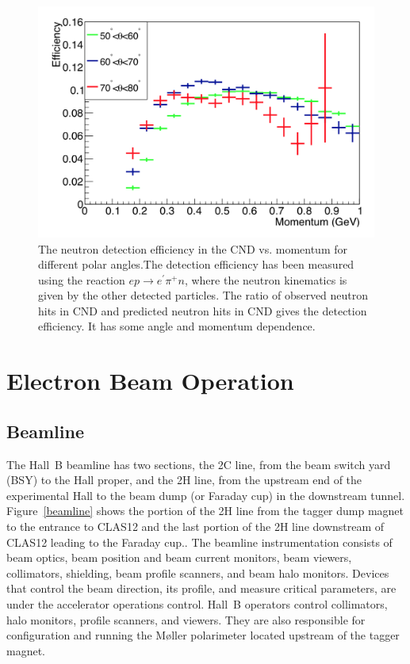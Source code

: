 \documentclass[final,3p,twocolumn]{elsarticle}
\begin{document}
\begin{figure}[htbp!]
\centerline{\includegraphics[width=0.9\columnwidth]{cnd-neutron-efficiency.png}}
\caption{The neutron detection efficiency in the CND vs. momentum for different polar angles.The  detection efficiency 
has been measured using the reaction $e p \to e^\prime \pi^+ n$, where the neutron kinematics is given by the other 
detected particles. The ratio of observed neutron hits in CND and predicted neutron hits in CND gives the detection efficiency. It 
has some angle and momentum dependence.  } 
\label{CND-neutron-efficiency}
\end{figure} 


\section{Electron Beam Operation} 

\subsection{Beamline}

The Hall~B beamline has two sections, the 2C line, from the beam switch yard (BSY) to the Hall proper, and the 2H
line, from the upstream end of the experimental Hall to the beam dump (or Faraday cup) in the downstream tunnel.
Figure~\ref{beamline} shows the portion of the 2H line from the tagger dump magnet to the entrance to CLAS12 and
the last portion of the 2H line downstream of CLAS12 leading to the Faraday cup.. The beamline instrumentation
consists of beam optics, beam position and beam current monitors, beam viewers, collimators,  shielding, beam
profile scanners, and beam halo monitors. Devices that control the beam direction, its profile, and  measure critical
parameters, are under the accelerator operations control. Hall~B operators control collimators, halo monitors,
profile scanners, and viewers. They are also responsible for configuration and running the M{\o}ller polarimeter
located upstream of the tagger magnet.
\end{document}
